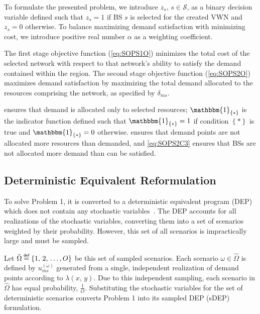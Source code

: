 \documentclass[conference]{IEEEtran}
\newcommand\defeq{\mathrel{\overset{\makebox[0pt]{\mbox{\normalfont\tiny\sffamily def}}}{=}}}
\begin{document}
To formulate the presented problem, we introduce $z_s,\, s \in \mathcal{S}$, as a binary decision variable defined such that $z_s = 1$ if BS $s$ is selected for the created VWN and $z_s = 0$ otherwise.  To balance maximizing demand satisfaction with minimizing cost, we introduce positive real number $\alpha$ as a weighting coefficient.

The first stage objective function (\cref{eq:SOPS1O}) minimizes the total cost of the selected network with respect to that network's ability to satisfy the demand contained within the region.  The second stage objective function (\cref{eq:SOPS2O}) maximizes demand satisfaction by maximizing the total demand allocated to the resources comprising the network, as specified by $\delta_{ms}$.

 ensures that demand is allocated only to selected resources; $\mathbbm{1}_{\left\{ * \right\}}$ is the indicator function defined such that $\mathbbm{1}_{\left\{ * \right\}} = 1$ if condition $\left\{ * \right\}$ is true and $\mathbbm{1}_{\left\{ * \right\}} = 0$ otherwise.   ensures that demand points are not allocated more resources than demanded, and \cref{eq:SOPS2C3} ensures that BSs are not allocated more demand than can be satisfied.

\subsection{Deterministic Equivalent Reformulation} \label{subsec:dep}

To solve Problem 1, it is converted to a deterministic equivalent program (DEP) which does not contain any stochastic variables~\cite{stochprogramming}.  The DEP accounts for all realizations of the stochastic variables, converting them into a set of scenarios weighted by their probability.  However, this set of all scenarios is impractically large and must be sampled.

Let $\hat{\Omega} \defeq \left\{ 1,\, 2,\, \ldots, O \right\}$ be this set of sampled scenarios.  Each scenario $\omega \in \hat{\Omega}$ is defined by $u_{ms}^{\left( \omega \right)}$ generated from a single, independent realization of demand points according to $\lambda\left( x,\, y \right)$.  Due to this independent sampling, each scenario in $\hat{\Omega}$ has equal probability, $\frac{1}{O}$.  Substituting the stochastic variables for the set of deterministic scenarios converts Problem 1 into its sampled DEP (sDEP) formulation.
\end{document}
